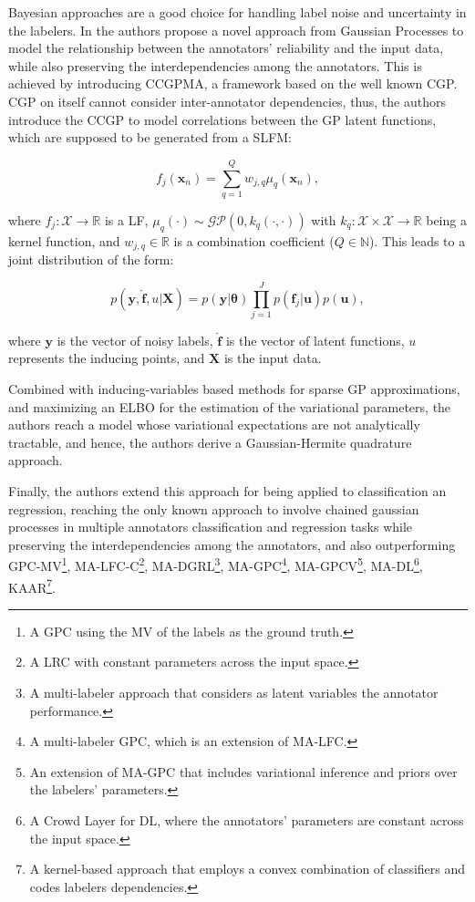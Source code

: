 Bayesian approaches are a good choice for handling label noise
and uncertainty in the labelers. In \cite{GilEtAlvarez2023CCGPMA} the
authors propose a novel approach from Gaussian Processes to model the
relationship between the annotators' reliability and the input data,
while also preserving the interdependencies among the annotators.
This is achieved by introducing \gls{CCGPMA}, a framework based on
the well known \gls{CGP}.
\gls{CGP} on itself cannot consider inter-annotator dependencies,
thus, the authors introduce the \gls{CCGP} to model correlations
between the GP latent functions, which are supposed to be generated
from a \gls{SLFM}:

\begin{equation}
  f_j(\mathbf{x}_n) = \sum_{q=1}^{Q} w_{j,q} \mu_q(\mathbf{x}_n),
\end{equation}

where $f_j : \mathcal{X} \to \mathbb{R}$ is a \gls{LF}, $\mu_q(\cdot) \sim
\mathcal{GP}(0, k_q(\cdot, \cdot))$ with $k_q : \mathcal{X} \times
\mathcal{X} \to \mathbb{R}$ being a kernel function, and $w_{j,q} \in
\mathbb{R}$ is a combination coefficient ($Q \in \mathbb{N}$). This leads
to a joint distribution of the form:

\begin{equation}
  p(\mathbf{y}, \hat{\mathbf{f}}, u | \mathbf{X}) = p(\mathbf{y} |
  \boldsymbol{\theta}) \prod_{j=1}^{J} p(\mathbf{f}_j | \mathbf{u})
  p(\mathbf{u}),
\end{equation}

where $\mathbf{y}$ is the vector of noisy labels, $\hat{\mathbf{f}}$
is the vector of latent functions, $u$ represents the inducing points,
and $\mathbf{X}$ is the input data.

Combined with inducing-variables based methods for sparse GP
approximations, and maximizing an \gls{ELBO} for the estimation of the
variational parameters, the authors reach a model whose variational
expectations are not analytically tractable, and hence, the authors
derive a Gaussian-Hermite quadrature approach.

Finally, the authors extend this approach for being applied to
classification an regression, reaching the only known approach to
involve chained gaussian processes in multiple annotators
classification and regression tasks while preserving the
interdependencies among the annotators, and also outperforming
GPC-MV\footnote{A GPC using the MV of the labels as the ground truth.},
MA-LFC-C\footnote{A LRC with constant parameters across the input space.},
MA-DGRL\footnote{A multi-labeler approach that considers as latent
variables the annotator performance.},
MA-GPC\footnote{A multi-labeler GPC, which is an extension of MA-LFC.},
MA-GPCV\footnote{An extension of MA-GPC that includes variational
inference and priors over the labelers' parameters.},
MA-DL\footnote{A Crowd Layer for DL, where the annotators' parameters
are constant across the input space.},
KAAR\footnote{A kernel-based approach that employs a convex
combination of classifiers and codes labelers dependencies.}.

